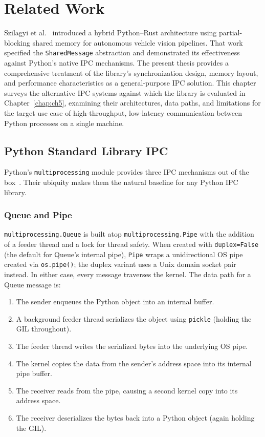\chapter{Related Work}
\label{chap:ch3}

Szilagyi et al.~\cite{szilagyi2025accelerating} introduced a hybrid Python--Rust architecture using partial-blocking shared memory for autonomous vehicle vision pipelines. That work specified the \texttt{SharedMessage} abstraction and demonstrated its effectiveness against Python's native IPC mechanisms. The present thesis provides a comprehensive treatment of the library's synchronization design, memory layout, and performance characteristics as a general-purpose IPC solution. This chapter surveys the alternative IPC systems against which the library is evaluated in Chapter~\ref{chap:ch5}, examining their architectures, data paths, and limitations for the target use case of high-throughput, low-latency communication between Python processes on a single machine.


\section{Python Standard Library IPC}
\label{sec:stdlib_ipc}

Python's \texttt{multiprocessing} module provides three IPC mechanisms out of the box~\cite{python_multiprocessing}. Their ubiquity makes them the natural baseline for any Python IPC library.

\subsection{Queue and Pipe}
\label{subsec:queue_pipe}

\texttt{multiprocessing.Queue} is built atop \texttt{multiprocessing.Pipe} with the addition of a feeder thread and a lock for thread safety. When created with \texttt{duplex=False} (the default for Queue's internal pipe), \texttt{Pipe} wraps a unidirectional OS pipe created via \texttt{os.pipe()}; the duplex variant uses a Unix domain socket pair instead. In either case, every message traverses the kernel. The data path for a Queue message is:

\begin{enumerate}
    \item The sender enqueues the Python object into an internal buffer.
    \item A background feeder thread serializes the object using \texttt{pickle} (holding the GIL throughout).
    \item The feeder thread writes the serialized bytes into the underlying OS pipe.
    \item The kernel copies the data from the sender's address space into its internal pipe buffer.
    \item The receiver reads from the pipe, causing a second kernel copy into its address space.
    \item The receiver deserializes the bytes back into a Python object (again holding the GIL).
\end{enumerate}

